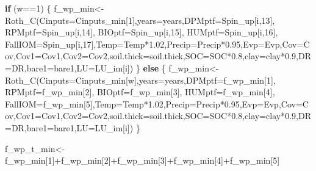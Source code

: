 \documentclass[
  10pt,
  b5paper,
]{book}
\newenvironment{Shaded}{\begin{snugshade}}{\end{snugshade}}
\newcommand{\AttributeTok}[1]{\textcolor[rgb]{0.77,0.63,0.00}{#1}}
\newcommand{\ControlFlowTok}[1]{\textcolor[rgb]{0.13,0.29,0.53}{\textbf{#1}}}
\newcommand{\DecValTok}[1]{\textcolor[rgb]{0.00,0.00,0.81}{#1}}
\newcommand{\FloatTok}[1]{\textcolor[rgb]{0.00,0.00,0.81}{#1}}
\newcommand{\FunctionTok}[1]{\textcolor[rgb]{0.00,0.00,0.00}{#1}}
\newcommand{\NormalTok}[1]{#1}
\newcommand{\OtherTok}[1]{\textcolor[rgb]{0.56,0.35,0.01}{#1}}
\newcommand{\SpecialCharTok}[1]{\textcolor[rgb]{0.00,0.00,0.00}{#1}}
\begin{document}
\begin{Shaded}
\begin{Highlighting}[]
\ControlFlowTok{if}\NormalTok{ (w}\SpecialCharTok{==}\DecValTok{1}\NormalTok{) \{}
\NormalTok{f\_wp\_min}\OtherTok{\textless{}{-}}\FunctionTok{Roth\_C}\NormalTok{(}\AttributeTok{Cinputs=}\NormalTok{Cinputs\_min[}\DecValTok{1}\NormalTok{],}\AttributeTok{years=}\NormalTok{years,}\AttributeTok{DPMptf=}\NormalTok{Spin\_up[i,}\DecValTok{13}\NormalTok{], }\AttributeTok{RPMptf=}\NormalTok{Spin\_up[i,}\DecValTok{14}\NormalTok{], }\AttributeTok{BIOptf=}\NormalTok{Spin\_up[i,}\DecValTok{15}\NormalTok{], }\AttributeTok{HUMptf=}\NormalTok{Spin\_up[i,}\DecValTok{16}\NormalTok{], }\AttributeTok{FallIOM=}\NormalTok{Spin\_up[i,}\DecValTok{17}\NormalTok{],}\AttributeTok{Temp=}\NormalTok{Temp}\SpecialCharTok{*}\FloatTok{1.02}\NormalTok{,}\AttributeTok{Precip=}\NormalTok{Precip}\SpecialCharTok{*}\FloatTok{0.95}\NormalTok{,}\AttributeTok{Evp=}\NormalTok{Evp,}\AttributeTok{Cov=}\NormalTok{Cov,}\AttributeTok{Cov1=}\NormalTok{Cov1,}\AttributeTok{Cov2=}\NormalTok{Cov2,}\AttributeTok{soil.thick=}\NormalTok{soil.thick,}\AttributeTok{SOC=}\NormalTok{SOC}\SpecialCharTok{*}\FloatTok{0.8}\NormalTok{,}\AttributeTok{clay=}\NormalTok{clay}\SpecialCharTok{*}\FloatTok{0.9}\NormalTok{,}\AttributeTok{DR=}\NormalTok{DR,}\AttributeTok{bare1=}\NormalTok{bare1,}\AttributeTok{LU=}\NormalTok{LU\_im[i])}
\NormalTok{\} }\ControlFlowTok{else}\NormalTok{ \{}
\NormalTok{f\_wp\_min}\OtherTok{\textless{}{-}}\FunctionTok{Roth\_C}\NormalTok{(}\AttributeTok{Cinputs=}\NormalTok{Cinputs\_min[w],}\AttributeTok{years=}\NormalTok{years,}\AttributeTok{DPMptf=}\NormalTok{f\_wp\_min[}\DecValTok{1}\NormalTok{], }\AttributeTok{RPMptf=}\NormalTok{f\_wp\_min[}\DecValTok{2}\NormalTok{], }\AttributeTok{BIOptf=}\NormalTok{f\_wp\_min[}\DecValTok{3}\NormalTok{], }\AttributeTok{HUMptf=}\NormalTok{f\_wp\_min[}\DecValTok{4}\NormalTok{], }\AttributeTok{FallIOM=}\NormalTok{f\_wp\_min[}\DecValTok{5}\NormalTok{],}\AttributeTok{Temp=}\NormalTok{Temp}\SpecialCharTok{*}\FloatTok{1.02}\NormalTok{,}\AttributeTok{Precip=}\NormalTok{Precip}\SpecialCharTok{*}\FloatTok{0.95}\NormalTok{,}\AttributeTok{Evp=}\NormalTok{Evp,}\AttributeTok{Cov=}\NormalTok{Cov,}\AttributeTok{Cov1=}\NormalTok{Cov1,}\AttributeTok{Cov2=}\NormalTok{Cov2,}\AttributeTok{soil.thick=}\NormalTok{soil.thick,}\AttributeTok{SOC=}\NormalTok{SOC}\SpecialCharTok{*}\FloatTok{0.8}\NormalTok{,}\AttributeTok{clay=}\NormalTok{clay}\SpecialCharTok{*}\FloatTok{0.9}\NormalTok{,}\AttributeTok{DR=}\NormalTok{DR,}\AttributeTok{bare1=}\NormalTok{bare1,}\AttributeTok{LU=}\NormalTok{LU\_im[i])}
\NormalTok{\}}

\NormalTok{f\_wp\_t\_min}\OtherTok{\textless{}{-}}\NormalTok{f\_wp\_min[}\DecValTok{1}\NormalTok{]}\SpecialCharTok{+}\NormalTok{f\_wp\_min[}\DecValTok{2}\NormalTok{]}\SpecialCharTok{+}\NormalTok{f\_wp\_min[}\DecValTok{3}\NormalTok{]}\SpecialCharTok{+}\NormalTok{f\_wp\_min[}\DecValTok{4}\NormalTok{]}\SpecialCharTok{+}\NormalTok{f\_wp\_min[}\DecValTok{5}\NormalTok{]}


\end{Highlighting}
\end{Shaded}
\end{document}
